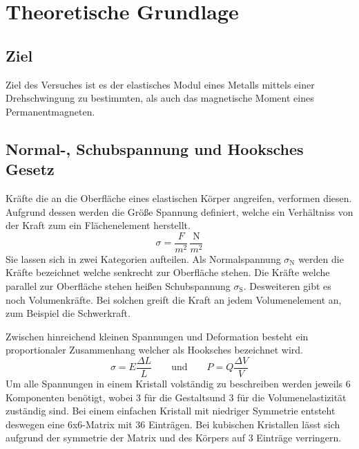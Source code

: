 \section{Theoretische Grundlage}
\label{sec:Theorie}
\subsection{Ziel}
Ziel des Versuches ist es der elastisches Modul eines Metalls mittels einer Drehschwingung zu bestimmten, als auch das magnetische Moment eines Permanentmagneten. 
\subsection{Normal-, Schubspannung und Hooksches Gesetz}
Kräfte die an die Oberfläche eines elastischen Körper angreifen, verformen diesen. Aufgrund dessen werden die Größe Spannung definiert, welche ein Verhältniss von der Kraft zum ein Flächenelement herstellt.
\begin{equation}
  \sigma = \frac{F}{m^2} \, \frac{\text{N}}{m^2}
  \label{eqn:Spannung}
\end{equation}
Sie lassen sich in zwei Kategorien aufteilen. Als Normalspannung $\sigma_\text{N}$ werden die Kräfte bezeichnet welche senkrecht zur Oberfläche stehen. Die Kräfte welche parallel zur Oberfläche stehen heißen Schubspannung $\sigma_\text{S}$. Desweiteren gibt es noch Volumenkräfte. Bei solchen greift die Kraft an jedem Volumenelement an, zum Beispiel die Schwerkraft.

Zwischen hinreichend kleinen Spannungen und Deformation besteht ein proportionaler Zusammenhang welcher als Hooksches bezeichnet wird. 
\begin{equation}
  \sigma = E \frac{\Delta L}{L}  \hspace{2em} \text{und} \hspace{2em} P = Q\frac{\Delta V}{V}
  \label{eqn:Hook}
\end{equation}
Um alle Spannungen in einem Kristall volständig zu beschreiben werden jeweils 6 Komponenten benötigt, wobei 3 für die Gestaltsund 3 für die Volumenelastizität zuständig sind. Bei einem einfachen  Kristall mit niedriger Symmetrie entsteht deswegen eine 6x6-Matrix mit 36 Einträgen. Bei kubischen Kristallen lässt sich aufgrund der symmetrie der Matrix und des Körpers auf 3 Einträge verringern.

